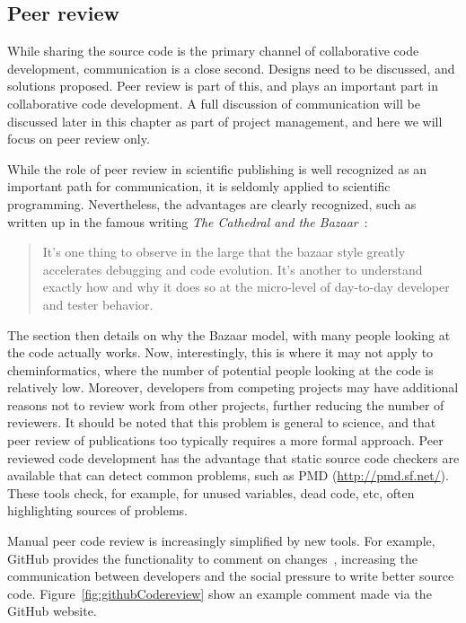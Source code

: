 \documentclass[11pt]{book}
\begin{document}
\subsection{Peer review}

While sharing the source code is the primary channel of collaborative
code development, communication is a close second. Designs
need to be discussed, and solutions proposed. Peer review
is part of this, and plays an important part in collaborative
code development. A full discussion of communication
will be discussed later in this chapter as part of project
management, and here we will focus on peer review only.

While the role of peer review in scientific publishing is
well recognized as an important path for communication, it is seldomly
applied to scientific programming. Nevertheless, the
advantages are clearly recognized, such as written up
in the famous writing \textit{The Cathedral and the Bazaar}~\cite{Raymond2001}:

\begin{quotation}
It's one thing to observe in the large that the bazaar style
greatly accelerates debugging and code evolution. It's
another to understand exactly how and why it does so at the
micro-level of day-to-day developer and tester behavior.
\end{quotation}

The section then details on why the Bazaar model, with many
people looking at the code actually works. Now, interestingly,
this is where it may not apply to cheminformatics, where
the number of potential people looking at the code is
relatively low. Moreover, developers from competing projects
may have additional reasons not to review work from other
projects, further reducing the number of reviewers. 
It should be noted that this problem is general to science,
and that peer review of publications too typically requires
a more formal approach. Peer reviewed code development 
has the advantage
that static source code checkers are available that can
detect common problems, such as PMD (\url{http://pmd.sf.net/}).
These tools check, for example, for unused variables, dead
code, etc, often highlighting sources of problems.

Manual peer code review is increasingly simplified by new
tools. For example, GitHub provides the functionality to
comment on changes~\cite{Chemblaics201005CodeReview},
increasing the communication between developers and the
social pressure to write better source code.
Figure~\ref{fig:githubCodereview} show an example comment
made via the GitHub website.
\end{document}
